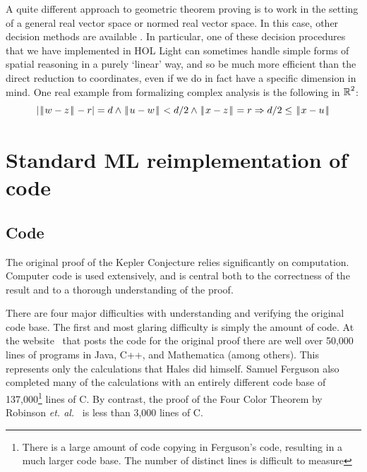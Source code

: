\documentclass[11pt]{amsart}
\def\|{{\hskip0.1em|\hskip-0.15em|\hskip0.1em}}
\newcommand{\real}{\mbox{$\protect\mathbb R$}}
\let\And=\wedge                    %
\newcommand{\Imp}{\Rightarrow}
\begin{document}
A quite different approach to geometric theorem proving is to work in the
setting of a general real vector space or normed real vector space. In this
case, other decision methods are available \cite{solovay-jointpaper}. In
particular, one of these decision procedures that we have implemented in HOL
Light can sometimes handle simple forms of spatial reasoning in a purely
`linear' way, and so be much more efficient than the direct reduction to
coordinates, even if we do in fact have a specific dimension in mind. One
real example from formalizing complex analysis is the following in $\real^2$:
$$ |\|w - z\| - r| = d \And \|u - w\| < d/2 \And \|x - z\| = r
   \Imp d/2 \leq \|x - u\|
$$

\section{Standard ML reimplementation of code}
\label{sec:code}

\subsection*{Code}

The original proof of the Kepler Conjecture relies significantly on
computation. Computer code is used extensively, and is central both to
the correctness of the result and to a thorough understanding of the
proof.

  There are four major difficulties with understanding and verifying
the original code base. The first and most glaring difficulty is
simply the amount of code. At the website~\cite{website:Hales:1998:Code}
that posts the code for the original proof
there are well over 50,000 lines of programs in Java, C++, and
Mathematica (among others). This represents only the calculations that Hales did himself.
Samuel Ferguson also completed many of the calculations with an entirely
different code base of 137,000\footnote{There is a large amount of
code copying in Ferguson's code, resulting in a much larger code base.
The number of distinct lines is difficult to measure} lines of C. By
contrast, the proof of the Four Color Theorem by Robinson \textit{et.
al.}~\cite{Robertson:1997:JCTB} is less than 3,000 lines of C.
\end{document}
